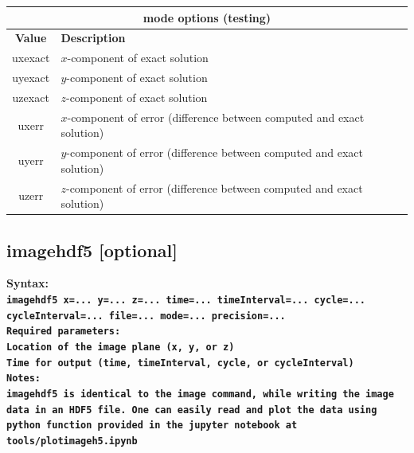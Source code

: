 \documentclass[11pt]{report}
\begin{document}
\begin{center}
\begin{tabular}{|c|l|} \hline
\multicolumn{2}{|c|}{\bf mode options (testing)}\\ \hline
\bf{Value} & \bf{Description} \\ 
\hline  \hline
uxexact & $x$-component of exact solution\\ \hline
uyexact & $y$-component of exact solution\\ \hline
uzexact & $z$-component of exact solution\\ \hline
uxerr   & $x$-component of error (difference between computed and exact solution)\\ \hline
uyerr   & $y$-component of error (difference between computed and exact solution)\\ \hline
uzerr   & $z$-component of error (difference between computed and exact solution)\\ \hline
\end{tabular}
\end{center}



\subsection{imagehdf5 [optional]}
\label{keyword:imagehdf5}
\begin{flushleft}
\bf Syntax:\\ \tt imagehdf5 x=... y=... z=...
time=... timeInterval=... cycle=... cycleInterval=... file=... mode=... precision=...\\ \bf Required
parameters:\\ \rm Location of the image plane (x, y, or z) \\ Time for output (time, timeInterval,
cycle, or cycleInterval)\\ \bf Notes: \\ imagehdf5 is identical to the image command, while writing the image data in an HDF5 file. One can easily read and plot the data using python function provided in the jupyter notebook at \verb+tools/plotimageh5.ipynb+
\end{flushleft}
\end{document}

